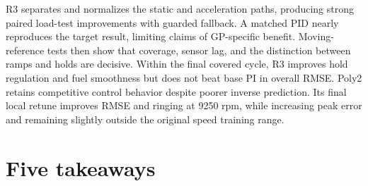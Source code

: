 \documentclass[11pt,a4paper,oneside]{report}
\begin{document}
R3 separates and normalizes the static and acceleration paths, producing strong paired load-test improvements with guarded fallback. A matched PID nearly reproduces the target result, limiting claims of GP-specific benefit. Moving-reference tests then show that coverage, sensor lag, and the distinction between ramps and holds are decisive. Within the final covered cycle, R3 improves hold regulation and fuel smoothness but does not beat base PI in overall RMSE. Poly2 retains competitive control behavior despite poorer inverse prediction. Its final local retune improves RMSE and ringing at 9250 rpm, while increasing peak error and remaining slightly outside the original speed training range.

\section{Five takeaways}
\end{document}
